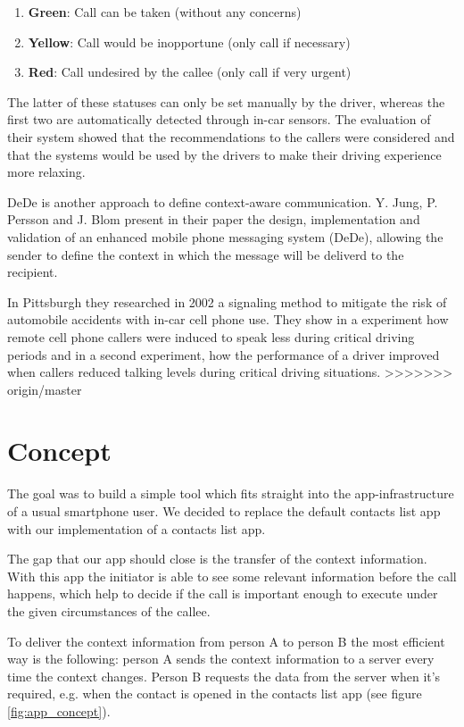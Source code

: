 \documentclass{sigchi}
\begin{document}
 \begin{enumerate}
\item \textbf{Green}: Call can be taken (without any concerns)
\item \textbf{Yellow}: Call would be inopportune (only call if necessary)
\item \textbf{Red}: Call undesired by the callee (only call if very urgent)
\end{enumerate}
 
 The latter of these statuses can only be set manually by the driver, whereas the first two are automatically detected through in-car sensors. The evaluation of their system showed that the recommendations to the callers were considered and that the systems would be used by the drivers to make their driving experience more relaxing.
 
 DeDe is another approach to define context-aware communication. Y. Jung, P. Persson and J. Blom present in their paper \cite{jung05} the design, implementation and validation of an enhanced mobile phone messaging system (DeDe), allowing the sender to define the context in which the message will be deliverd to the recipient.
 
 In Pittsburgh they researched in 2002 \cite{samar02} a signaling method to mitigate the risk of automobile accidents with in-car cell phone use. They show in a experiment how remote cell phone callers were induced to speak less during critical driving periods and in a second experiment, how the performance of a driver improved when callers reduced talking levels during critical driving situations.
>>>>>>> origin/master

\section{Concept}
The goal was to build a simple tool which fits straight into the app-infrastructure of a usual smartphone user. We decided to replace the default contacts list app with our implementation of a contacts list app.

The gap that our app should close is the transfer of the context information. With this app the initiator is able to see some relevant information before the call happens, which help to decide if the call is important enough to execute under the given circumstances of the callee.

To deliver the context information from person A to person B the most efficient way is the following:
person A sends the context information to a server every time the context changes. Person B requests the data from the server when it's required, e.g. when the contact is opened in the contacts list app (see figure \ref{fig:app_concept}).
\end{document}
